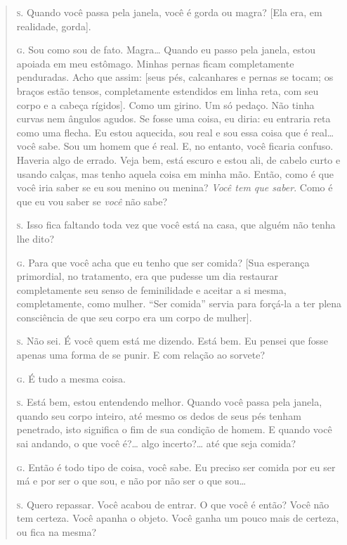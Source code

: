 \begin{quote}
\noindent\hskip0mm\textsc{s.} Quando você passa pela janela, você é gorda ou magra? [Ela era, em
realidade, gorda].

\noindent\hskip0mm\textsc{g.} Sou como sou de fato. Magra\ldots{} Quando eu passo pela janela, estou
apoiada em meu estômago. Minhas pernas ficam completamente penduradas.
Acho que assim: [seus pés, calcanhares e pernas se tocam; os braços
estão tensos, completamente estendidos em linha reta, com seu corpo e
a cabeça rígidos]. Como um girino. Um só pedaço. Não tinha curvas nem
ângulos agudos. Se fosse uma coisa, eu diria: eu entraria reta como uma
flecha. Eu estou aquecida, sou real e sou essa coisa que é real\ldots{} você
sabe. Sou um homem que é real. E, no entanto, você ficaria confuso.
Haveria algo de errado. Veja bem, está escuro e estou ali, de cabelo
curto e usando calças, mas tenho aquela coisa em minha mão. Então, como
é que você iria saber se eu sou menino ou menina? \textit{Você tem que
saber}. Como é que eu vou saber se \textit{você} não sabe?

\noindent\hskip0mm\textsc{s.} Isso fica faltando toda vez que você está na casa, que alguém não
tenha lhe dito?

\noindent\hskip0mm\textsc{g.} Para que você acha que eu tenho que ser comida? [Sua esperança
primordial, no tratamento, era que pudesse um dia restaurar
completamente seu senso de feminilidade e aceitar a si mesma,
completamente, como mulher. ``Ser comida''
servia para forçá-la a ter plena consciência de que seu corpo era um
corpo de mulher].

\noindent\hskip0mm\textsc{s.} Não sei. É você quem está me dizendo. Está bem. Eu pensei que fosse
apenas uma forma de se punir.\idxmasoqpun{} E com relação ao sorvete?

\noindent\hskip0mm\textsc{g.} É tudo a mesma coisa.

\noindent\hskip0mm\textsc{s.} Está bem, estou entendendo melhor. Quando você passa pela janela,
quando seu corpo inteiro, até mesmo os dedos de seus pés tenham
penetrado, isto significa o fim de sua condição de homem. E quando você
sai andando, o que você é?\ldots{} algo incerto?\ldots{} até que seja comida?

\noindent\hskip0mm\textsc{g.} Então é todo tipo de coisa, você sabe. Eu preciso ser comida por eu
ser má e por ser o que sou, e não por não ser o que sou\ldots{}

\noindent\hskip0mm\textsc{s.} Quero repassar. Você acabou de entrar. O que você é então? Você não
tem certeza. Você apanha o objeto. Você ganha um pouco mais de certeza,
ou fica na mesma?


\end{quote}
